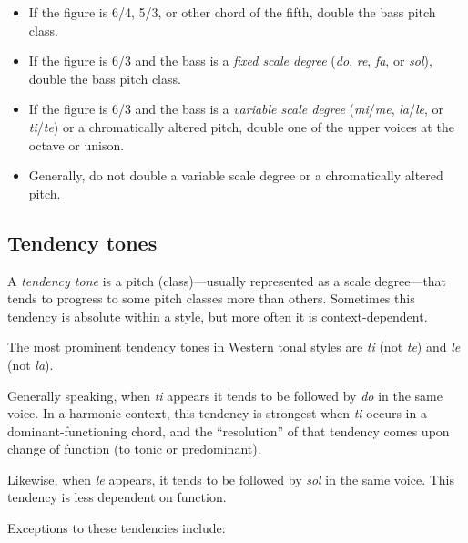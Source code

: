 \documentclass{book}
\providecommand{\tightlist}{%
  \setlength{\itemsep}{0pt}\setlength{\parskip}{0pt}}
\begin{document}
\begin{itemize}
\tightlist
\item
  If the figure is 6/4, 5/3, or other chord of the fifth, double the bass
  pitch class.\\
\item
  If the figure is 6/3 and the bass is a \emph{fixed scale degree} (\emph{do},
  \emph{re}, \emph{fa}, or \emph{sol}), double the bass pitch class.\\
\item
  If the figure is 6/3 and the bass is a \emph{variable scale degree}
  (\emph{mi}/\emph{me}, \emph{la}/\emph{le}, or \emph{ti}/\emph{te}) or a
  chromatically altered pitch, double one of the upper voices at the octave or
  unison.\\
\item
  Generally, do not double a variable scale degree or a chromatically altered
  pitch.
\end{itemize}

\hypertarget{tendency-tones-1}{%
\subsection{Tendency tones}\label{tendency-tones-1}}

A \emph{tendency tone} is a pitch (class)---usually represented as a scale
degree---that tends to progress to some pitch classes more than others.
Sometimes this tendency is absolute within a style, but more often it is
context-dependent.

The most prominent tendency tones in Western tonal styles are \emph{ti} (not
\emph{te}) and \emph{le} (not \emph{la}).

Generally speaking, when \emph{ti} appears it tends to be followed by
\emph{do} in the same voice. In a harmonic context, this tendency is strongest
when \emph{ti} occurs in a dominant-functioning chord, and the ``resolution''
of that tendency comes upon change of function (to tonic or predominant).

Likewise, when \emph{le} appears, it tends to be followed by \emph{sol} in the
same voice. This tendency is less dependent on function.

Exceptions to these tendencies include:
\end{document}
